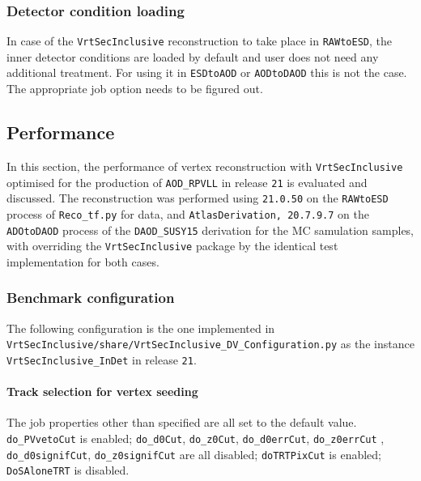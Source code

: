 \subsubsection{Detector condition loading}
In case of the {\tt VrtSecInclusive} reconstruction to take place in {\tt RAWtoESD}, the inner detector conditions are loaded by default and user does not need any additional treatment. For using it in {\tt ESDtoAOD} or {\tt AODtoDAOD} this is not the case. The appropriate job option needs to be figured out.


\subsection{Performance}
\label{sec:result}

In this section, the performance of vertex reconstruction with {\tt VrtSecInclusive} optimised for the production of {\tt AOD\_RPVLL} in release {\tt 21} is evaluated and discussed. The reconstruction was performed using {\tt 21.0.50} on the {\tt RAWtoESD} process of {\tt Reco\_tf.py} for data, and {\tt AtlasDerivation, 20.7.9.7} on the {\tt ADOtoDAOD} process of the {\tt DAOD\_SUSY15} derivation for the MC samulation samples, with overriding the {\tt VrtSecInclusive} package by the identical test implementation for both cases.

\subsubsection{Benchmark configuration}
The following configuration is the one implemented in\\{\tt VrtSecInclusive/share/VrtSecInclusive\_DV\_Configuration.py} as the instance\\ {\tt VrtSecInclusive\_InDet} in release {\tt 21}.

\paragraph{Track selection for vertex seeding}
The job properties other than specified are all set to the default value.
{\tt do\_PVvetoCut} is enabled; {\tt do\_d0Cut}, {\tt do\_z0Cut}, {\tt do\_d0errCut}, {\tt do\_z0errCut} , {\tt do\_d0signifCut}, {\tt do\_z0signifCut} are all disabled; {\tt doTRTPixCut} is enabled; {\tt DoSAloneTRT} is disabled.

